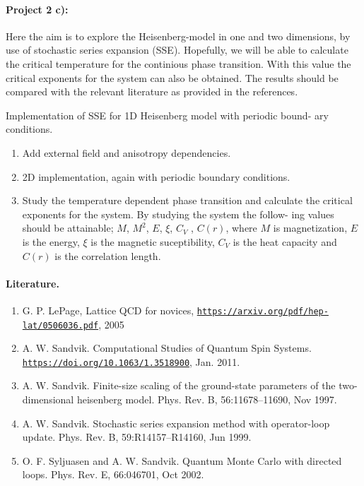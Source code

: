 \documentclass[%
oneside,                 %
final,                   %
10pt]{article}
\begin{document}
\paragraph{Project 2 c):}
Here the aim is to explore the Heisenberg-model in one and two
dimensions, by use of stochastic series expansion (SSE). Hopefully, we
will be able to calculate the critical temperature for the continious
phase transition. With this value the critical exponents for the
system can also be obtained.  The results should be compared with the
relevant literature as provided in the references.

Implementation of SSE for 1D Heisenberg model with periodic bound- ary conditions.
\begin{enumerate}
\item Add external field and anisotropy dependencies.

\item 2D implementation, again with periodic boundary conditions.

\item Study the temperature dependent phase transition and calculate the critical exponents for the system. By studying the system the follow- ing values should be attainable; $M$, $M^2$, $E$, $\xi$, $C_V$ , $C(r)$, where $M$ is magnetization, $E$ is the energy, $\xi$ is the magnetic suceptibility, $C_V$ is the heat capacity and $C(r)$ is the correlation length.
\end{enumerate}

\noindent
\paragraph{Literature.}
\begin{enumerate}
\item G. P. LePage, Lattice QCD for novices, \href{{https://arxiv.org/pdf/hep-lat/0506036.pdf}}{\nolinkurl{https://arxiv.org/pdf/hep-lat/0506036.pdf}}, 2005

\item A. W. Sandvik. Computational Studies of Quantum Spin Systems. \href{{https://doi.org/10.1063/1.3518900}}{\nolinkurl{https://doi.org/10.1063/1.3518900}}, Jan. 2011.

\item A. W. Sandvik. Finite-size scaling of the ground-state parameters of the two-dimensional heisenberg model. Phys. Rev. B, 56:11678–11690, Nov 1997.

\item A. W. Sandvik. Stochastic series expansion method with operator-loop update. Phys. Rev. B, 59:R14157–R14160, Jun 1999.

\item O. F. Syljuasen and A. W. Sandvik. Quantum Monte Carlo with directed loops. Phys. Rev. E, 66:046701, Oct 2002.
\end{enumerate}
\end{document}
